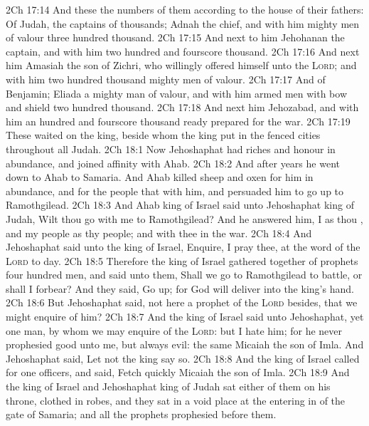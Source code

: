 \vs 2Ch 17:14 And these  the numbers of them according to the house of their fathers: Of Judah, the captains of thousands; Adnah the chief, and with him mighty men of valour three hundred thousand.
\vs 2Ch 17:15 And next to him  Jehohanan the captain, and with him two hundred and fourscore thousand.
\vs 2Ch 17:16 And next him  Amasiah the son of Zichri, who willingly offered himself unto the \textsc{Lord}; and with him two hundred thousand mighty men of valour.
\vs 2Ch 17:17 And of Benjamin; Eliada a mighty man of valour, and with him armed men with bow and shield two hundred thousand.
\vs 2Ch 17:18 And next him  Jehozabad, and with him an hundred and fourscore thousand ready prepared for the war.
\vs 2Ch 17:19 These waited on the king, beside  whom the king put in the fenced cities throughout all Judah.
\vs 2Ch 18:1 Now Jehoshaphat had riches and honour in abundance, and joined affinity with Ahab.
\vs 2Ch 18:2 And after  years he went down to Ahab to Samaria. And Ahab killed sheep and oxen for him in abundance, and for the people that  with him, and persuaded him to go up  to Ramothgilead.
\vs 2Ch 18:3 And Ahab king of Israel said unto Jehoshaphat king of Judah, Wilt thou go with me to Ramothgilead? And he answered him, I  as thou , and my people as thy people; and  with thee in the war.
\vs 2Ch 18:4 And Jehoshaphat said unto the king of Israel, Enquire, I pray thee, at the word of the \textsc{Lord} to day.
\vs 2Ch 18:5 Therefore the king of Israel gathered together of prophets four hundred men, and said unto them, Shall we go to Ramothgilead to battle, or shall I forbear? And they said, Go up; for God will deliver  into the king's hand.
\vs 2Ch 18:6 But Jehoshaphat said,  not here a prophet of the \textsc{Lord} besides, that we might enquire of him?
\vs 2Ch 18:7 And the king of Israel said unto Jehoshaphat,  yet one man, by whom we may enquire of the \textsc{Lord}: but I hate him; for he never prophesied good unto me, but always evil: the same  Micaiah the son of Imla. And Jehoshaphat said, Let not the king say so.
\vs 2Ch 18:8 And the king of Israel called for one  officers, and said, Fetch quickly Micaiah the son of Imla.
\vs 2Ch 18:9 And the king of Israel and Jehoshaphat king of Judah sat either of them on his throne, clothed in  robes, and they sat in a void place at the entering in of the gate of Samaria; and all the prophets prophesied before them.
